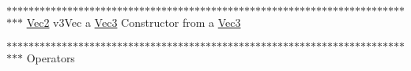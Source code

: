 \label{struct_vec2_a5aa4bd05c9e8e57239ad1e0991553417}
$\ast$$\ast$$\ast$$\ast$$\ast$$\ast$$\ast$$\ast$$\ast$$\ast$$\ast$$\ast$$\ast$$\ast$$\ast$$\ast$$\ast$$\ast$$\ast$$\ast$$\ast$$\ast$$\ast$$\ast$$\ast$$\ast$$\ast$$\ast$$\ast$$\ast$$\ast$$\ast$$\ast$$\ast$$\ast$$\ast$$\ast$$\ast$$\ast$$\ast$$\ast$$\ast$$\ast$$\ast$$\ast$$\ast$$\ast$$\ast$$\ast$$\ast$$\ast$$\ast$$\ast$$\ast$$\ast$$\ast$$\ast$$\ast$$\ast$$\ast$$\ast$$\ast$$\ast$$\ast$$\ast$$\ast$$\ast$$\ast$$\ast$$\ast$$\ast$$\ast$$\ast$$\ast$$\ast$  \hyperlink{struct_vec2}{Vec2}  v3Vec a \hyperlink{struct_vec3}{Vec3}  Constructor from a \hyperlink{struct_vec3}{Vec3}

$\ast$$\ast$$\ast$$\ast$$\ast$$\ast$$\ast$$\ast$$\ast$$\ast$$\ast$$\ast$$\ast$$\ast$$\ast$$\ast$$\ast$$\ast$$\ast$$\ast$$\ast$$\ast$$\ast$$\ast$$\ast$$\ast$$\ast$$\ast$$\ast$$\ast$$\ast$$\ast$$\ast$$\ast$$\ast$$\ast$$\ast$$\ast$$\ast$$\ast$$\ast$$\ast$$\ast$$\ast$$\ast$$\ast$$\ast$$\ast$$\ast$$\ast$$\ast$$\ast$$\ast$$\ast$$\ast$$\ast$$\ast$$\ast$$\ast$$\ast$$\ast$$\ast$$\ast$$\ast$$\ast$$\ast$$\ast$$\ast$$\ast$$\ast$$\ast$$\ast$$\ast$$\ast$$\ast$ Operators

